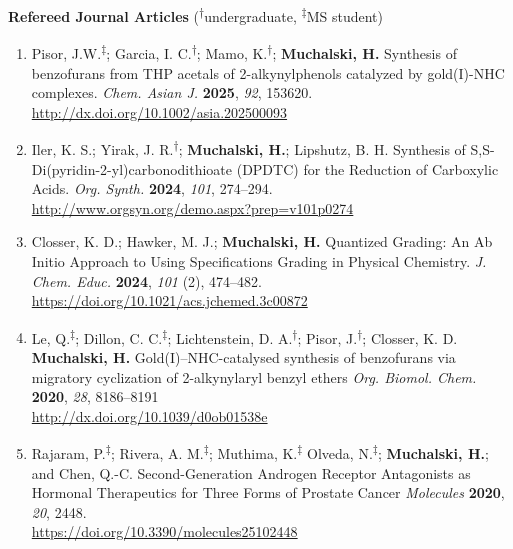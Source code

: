\documentclass[11pt,letterpaper]{article}
\newcommand{\mhead}[1]{\leavevmode\marginpar{\sffamily\footnotesize #1}}
\begin{document}
\newpage
\mhead{Publications}%
\textbf{Refereed Journal Articles} (\textsuperscript{$\dagger$}undergraduate, \textsuperscript{$\ddagger$}MS student)\newline

\begin{enumerate}[itemindent=0pt]

	\item Pisor, J.W.\textsuperscript{$\ddagger$}; Garcia, I. C.\textsuperscript{$\dagger$}; Mamo, K.\textsuperscript{$\dagger$}; \textbf{Muchalski, H.} Synthesis of benzofurans from THP acetals of 2-alkynylphenols catalyzed by gold(I)-NHC complexes. \textit{Chem. Asian J.} \textbf{2025}, \textit{92}, 153620.\\
	\href{http://dx.doi.org/10.1002/asia.202500093}{http://dx.doi.org/10.1002/asia.202500093}

  \item{Iler, K. S.; Yirak, J. R.\textsuperscript{$\dagger$}; \textbf{Muchalski, H.}; Lipshutz, B. H. Synthesis of S,S-Di(pyridin-2-yl)carbonodithioate (DPDTC) for the Reduction of Carboxylic Acids. \textit{Org. Synth.} \textbf{2024}, \textit{101}, 274--294.}\\
  \href{http://www.orgsyn.org/demo.aspx?prep=v101p0274}{http://www.orgsyn.org/demo.aspx?prep=v101p0274}

  \item{Closser, K. D.; Hawker, M. J.; \textbf{Muchalski, H.} Quantized Grading: An Ab Initio Approach to Using Specifications Grading in Physical Chemistry. \textit{J. Chem. Educ.} \textbf{2024}, \textit{101} (2), 474--482.}\\
  \href{https://doi.org/10.1021/acs.jchemed.3c00872}{https://doi.org/10.1021/acs.jchemed.3c00872}
	
  \item Le, Q.\textsuperscript{$\ddagger$}; Dillon, C. C.\textsuperscript{$\ddagger$}; Lichtenstein, D. A.\textsuperscript{$\dagger$}; Pisor, J.\textsuperscript{$\dagger$}; Closser, K. D.   \textbf{Muchalski, H.} Gold(I)--NHC-catalysed synthesis of benzofurans via migratory cyclization of 2-alkynylaryl benzyl ethers \textit{Org. Biomol. Chem.} \textbf{2020}, \textit{28}, 8186--8191\\
  \href{http://dx.doi.org/10.1039/d0ob01538e }{http://dx.doi.org/10.1039/d0ob01538e }
  
	\item Rajaram, P.\textsuperscript{$\ddagger$}; Rivera, A. M.\textsuperscript{$\ddagger$}; Muthima, K.\textsuperscript{$\ddagger$} Olveda, N.\textsuperscript{$\ddagger$}; \textbf{Muchalski, H.}; and Chen, Q.-C. Second-Generation Androgen Receptor Antagonists as Hormonal 
Therapeutics for Three Forms of Prostate Cancer \textit{Molecules} \textbf{2020}, \textit{20}, 2448.\\
	\href{https://doi.org/10.3390/molecules25102448}{https://doi.org/10.3390/molecules25102448}


\end{enumerate}
\end{document}
